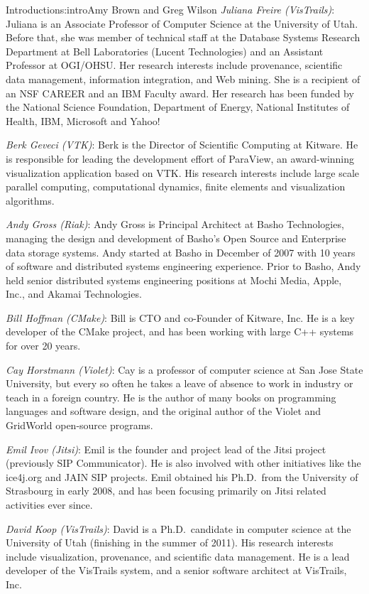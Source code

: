 \begin{aosachapter}{Introduction}{s:intro}{Amy Brown and Greg Wilson}
\emph{Juliana Freire (VisTrails)}: Juliana is an Associate Professor
of Computer Science at the University of Utah. Before that, she was member
of technical staff at the Database Systems Research Department at Bell
Laboratories (Lucent Technologies) and an Assistant Professor at
OGI/OHSU\@. Her research interests include provenance, scientific data
management, information integration, and Web mining.  She is a
recipient of an NSF CAREER and an IBM Faculty award.  Her research has
been funded by the National Science Foundation, Department of Energy,
National Institutes of Health, IBM, Microsoft and Yahoo!

\emph{Berk Geveci (VTK)}: Berk is the Director of Scientific
Computing at Kitware. He is responsible for leading the
development effort of ParaView, an award-winning visualization
application based on VTK\@. His research interests include large
scale parallel computing, computational dynamics, finite elements
and visualization algorithms.

\emph{Andy Gross (Riak)}: Andy Gross is Principal Architect at Basho
Technologies, managing the design and development of Basho's Open
Source and Enterprise data storage systems. Andy started at Basho in
December of 2007 with 10 years of software and distributed systems
engineering experience.  Prior to Basho, Andy held senior distributed
systems engineering positions at Mochi Media, Apple, Inc., and Akamai
Technologies.

\emph{Bill Hoffman (CMake)}: Bill is CTO and co-Founder of
Kitware, Inc.  He is a key developer of the CMake project, and has
been working with large C++ systems for over 20 years.

\emph{Cay Horstmann (Violet)}: Cay is a professor of
computer science at San Jose State University, but every so often
he takes a leave of absence to work in industry or teach in a
foreign country.  He is the author of many books on programming
languages and software design, and the original author of the
Violet and GridWorld open-source programs.

\emph{Emil Ivov (Jitsi)}: Emil is the founder and project
lead of the Jitsi project (previously SIP Communicator). He is
also involved with other initiatives like the ice4j.org and JAIN
SIP projects. Emil obtained his Ph.D.\ from the University of
Strasbourg in early 2008, and has been focusing primarily on Jitsi
related activities ever since.

\emph{David Koop (VisTrails)}: David is a Ph.D.\ candidate in computer
science at the University of Utah (finishing in the summer of
2011). His research interests include visualization, provenance, and
scientific data management. He is a lead developer of the VisTrails
system, and a senior software architect at VisTrails, Inc.


\end{aosachapter}
